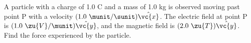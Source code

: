         A particle with a charge of 1.0 C and a mass of 1.0 kg is observed moving past point P
        with a velocity $(1.0\ \munit/\sunit)\hat{\vc{x}}$. The electric field at point P is
        $(1.0\ \zu{V}/\munit)\hat{\vc{y}}$, and the magnetic field is
        $(2.0\ \zu{T})\hat{\vc{y}}$. Find the force experienced by the particle.\answercheck
